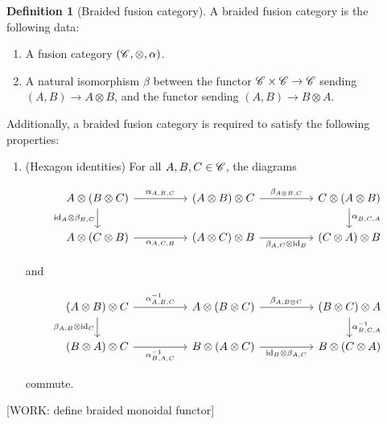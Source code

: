 \documentclass{article}
\theoremstyle{definition}
\newtheorem*{definition}{Definition}
\numberwithin{figure}{section}
\begin{document}
\begin{definition}[Braided fusion category] A braided fusion category is the following data:

\begin{enumerate}
\item A fusion category $(\mathscr{C},\otimes,\alpha)$.
\item A natural isomorphism $\beta$ between the functor $\mathscr{C}\times \mathscr{C}\to \mathscr{C}$ sending $(A,B)\to A\otimes B$, and the functor sending $(A,B)\to B\otimes A$.
\end{enumerate}

Additionally, a braided fusion category is required to satisfy the following properties:

\begin{enumerate}
\item (Hexagon identities) For all $A,B,C\in \mathscr{C}$, the diagrams

\[\begin{tikzcd}
	{A\otimes (B\otimes C)} && {(A\otimes B)\otimes C} && {C\otimes (A\otimes B)} \\
	{A\otimes (C\otimes B)} && {(A\otimes C)\otimes B} && {(C\otimes A)\otimes B}
	\arrow["{\alpha_{A,B,C}}", from=1-1, to=1-3]
	\arrow["{\beta_{A\otimes B,C}}", from=1-3, to=1-5]
	\arrow["{\alpha^{}_{B,C,A}}", from=1-5, to=2-5]
	\arrow["{\text{id}_A\otimes \beta_{B,C}}"', from=1-1, to=2-1]
	\arrow["{\alpha_{A,C,B}}"', from=2-1, to=2-3]
	\arrow["{\beta_{A,C}\otimes \text{id}_B}"', from=2-3, to=2-5]
\end{tikzcd}\]

and

\[\begin{tikzcd}
	{(A\otimes B)\otimes C} && {A\otimes (B\otimes C)} && {(B\otimes C)\otimes A} \\
	{(B\otimes A)\otimes C} && {B\otimes (A\otimes C)} && {B\otimes (C\otimes A)}
	\arrow["{\alpha^{-1}_{A,B,C}}", from=1-1, to=1-3]
	\arrow["{\beta_{A,B\otimes C}}", from=1-3, to=1-5]
	\arrow["{\alpha^{-1}_{B,C,A}}", from=1-5, to=2-5]
	\arrow["{\beta_{A,B}\otimes \text{id}_C}"', from=1-1, to=2-1]
	\arrow["{\alpha^{-1}_{B,A,C}}"', from=2-1, to=2-3]
	\arrow["{\text{id}_B\otimes \beta_{A,C}}"', from=2-3, to=2-5]
\end{tikzcd}\]

commute.
\end{enumerate}

\raggedleft\qedsymbol{}
\end{definition}

[WORK: define braided monoidal functor]
\end{document}
